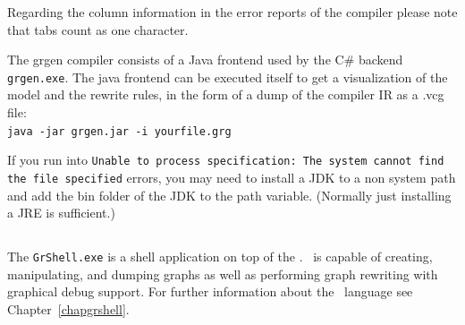 \begin{note}
Regarding the column information in the error reports of the compiler please note that tabs count as one character.
\end{note}

\begin{note}\label{note:modelruledump}
The grgen compiler consists of a Java frontend used by the C\# backend \texttt{grgen.exe}.
The java frontend can be executed itself to get a visualization of the model and the rewrite rules,
in the form of a dump of the compiler IR as a .vcg file:\\
\texttt{java -jar grgen.jar -i yourfile.grg}
\end{note}

\begin{note}
If you run into \texttt{Unable to process specification: The system cannot find the file specified} errors, 
you may need to install a JDK to a non system path and add the bin folder of the JDK to the path variable.
(Normally just installing a JRE is sufficient.)
\end{note}

\pagebreak

\subsection{\texttt{}}

\noindent The \texttt{GrShell.exe} is a shell application on top of the \LibGr.
\GrShell\ is capable of creating, manipulating, and dumping graphs as well as performing graph rewriting with graphical debug support.
For further information about the \GrShell\ language see Chapter~\ref{chapgrshell}.

